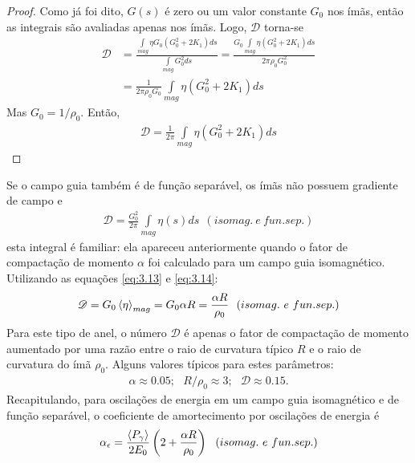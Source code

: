 \begin{proof}
	Como já foi dito, $G(s)$ é zero ou um valor constante $G_0$ nos ímãs, então as integrais são avaliadas apenas nos ímãs. Logo, $\mathscr{D}$ torna-se
	\begin{align*}
		\mathscr{D} &= \frac{\int\limits_{mag}^{} \eta G_0 \left(G_0^2 + 2K_1\right)ds}{\int\limits_{mag}^{} G_0^2 ds} = \frac{G_0\int\limits_{mag}^{} \eta \left(G_0^2 + 2K_1\right)ds}{2\pi \rho_0 G_0^2}\\
		 &= \frac{1}{2\pi \rho_0 G_0}\int\limits_{mag}^{} \eta \left(G_0^2 + 2K_1\right)ds
	\end{align*}
	Mas $G_0 = 1/\rho_0$. Então,
	\begin{align*}
		\mathscr{D} = \frac{1}{2\pi}\int\limits_{mag}^{} \eta \left(G_0^2 + 2K_1\right)ds
	\end{align*}
\end{proof}

Se o campo guia também é de função separável, os ímãs não possuem gradiente de campo e
\begin{align}
	\mathscr{D} = \frac{G_0^2}{2\pi}\int\limits_{mag}^{}\eta(s)ds\ \ (isomag.\ e\ fun. sep.)
\end{align}
esta integral é familiar: ela apareceu anteriormente quando o fator de compactação de momento $\alpha$ foi calculado para um campo guia isomagnético. Utilizando as equações \eqref{eq:3.13} e \eqref{eq:3.14}:
\begin{align}
	\mathscr{D} = G_0\left< \eta \right>_{mag} = G_0\alpha R = \frac{\alpha R}{\rho_0}\ \ (isomag.\ e\ fun. sep.)
\end{align}
Para este tipo de anel, o número $\mathscr{D}$ é apenas o fator de compactação de momento aumentado por uma razão entre o raio de curvatura típico $R$ e o raio de curvatura do ímã $\rho_0$. Alguns valores típicos para estes parâmetros:
\begin{align}
	\alpha \approx 0.05;\ \ \ R/\rho_0 \approx 3;\ \ \ \mathscr{D} \approx 0.15.
\end{align}
Recapitulando, para oscilações de energia em um campo guia isomagnético e de função separável, o coeficiente de amortecimento por oscilações de energia é
\begin{align}
	\alpha_\epsilon = \frac{\left< P_\gamma \right>}{2E_0}\left(2+ \frac{\alpha R}{\rho_0}\right)\ \ (isomag.\ e\ fun. sep.)
\end{align}